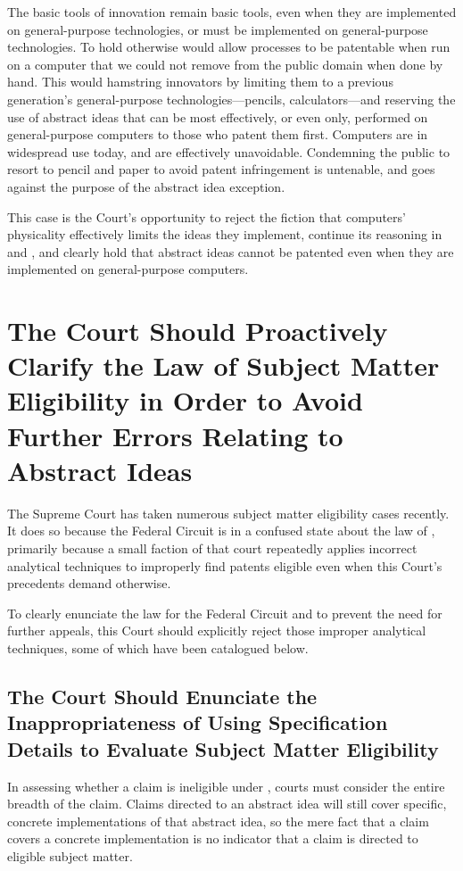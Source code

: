 \documentclass{scotus}
\begin{document}
The basic tools of innovation remain basic tools, even when they are implemented
on general-purpose technologies, or must be implemented on general-purpose
technologies.  To hold otherwise would allow processes to be patentable when run
on a computer that we could not remove from the public domain when done by hand.
This would hamstring innovators by limiting them to a previous generation's
general-purpose technologies—pencils, calculators—and reserving the use of
abstract ideas that can be most effectively, or even only, performed on
general-purpose computers to those who patent them first.  Computers are in
widespread use today, and are effectively unavoidable. Condemning the public to
resort to pencil and paper to avoid patent infringement is untenable, and goes
against the purpose of the abstract idea exception.

This case is the Court's opportunity to reject the fiction that computers'
physicality effectively limits the ideas they implement, continue its reasoning in
 and , and clearly hold that abstract ideas cannot be
patented even when they are implemented on general-purpose computers.

\section{The Court Should Proactively Clarify the Law of Subject Matter
Eligibility in Order to Avoid Further Errors Relating to Abstract Ideas}

The Supreme Court has taken numerous subject matter eligibility cases recently.
It does so because the Federal Circuit is in a confused state about the law of
, primarily because a small faction of that court repeatedly applies
incorrect analytical techniques to improperly find patents eligible even when
this Court's precedents demand otherwise.

To clearly enunciate the law for the Federal Circuit and to prevent the need for
further appeals, this Court should explicitly reject those improper analytical
techniques, some of which have been catalogued below.

\subsection{The Court Should Enunciate the Inappropriateness of Using
Specification Details to Evaluate Subject Matter Eligibility}

In assessing whether a claim is ineligible under , courts must
consider the entire breadth of the claim. Claims directed to an abstract idea
will still cover specific, concrete implementations of that abstract idea, so
the mere fact that a claim covers a concrete implementation is no indicator that
a claim is directed to eligible subject matter.
\end{document}
